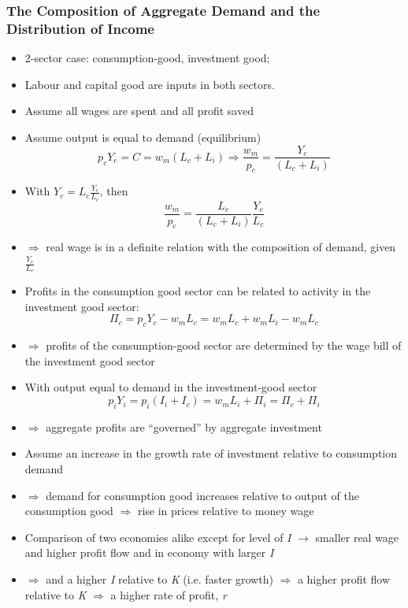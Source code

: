 \documentclass[a4paper,twoside]{article}
\numberwithin{equation}{section}
\numberwithin{figure}{section}
\begin{document}
\subsubsection{The Composition of Aggregate Demand and the Distribution of Income}
	\begin{itemize}
		\item 2-sector case: consumption-good, investment good;
		\item Labour and capital good are inputs in both sectors.
		\item Assume all wages are spent and all profit saved
		\item Assume output is equal to demand (equilibrium)
		\begin{equation}
			p_c Y_c = C = w_m \left( L_c + L_i \right) \Rightarrow \frac{w_m}{p_c} = \frac{Y_c}{\left( L_c + L_i \right)} \label{E:4.17}
		\end{equation}
		\item With \( Y_c = L_c \frac{Y_c}{L_c} \), then
		\begin{equation}
			\frac{w_m}{p_c} = \frac{L_c}{\left( L_c + L_i \right)}\frac{Y_c}{L_c} \label{E:4.18}
		\end{equation}
		\item \(\Rightarrow\) real wage is in a definite relation with the composition of demand, given \( \frac{Y_c}{L_c} \)
		\item  Profits in the consumption good sector can be related to activity in the investment good sector: 
		\begin{equation}
			\Pi_c = p_c Y_c - w_m L_c = w_m L_c + w_m L_i - w_m L_c \label{E:4.19}
		\end{equation}
		\item \( \Rightarrow \) profits of the consumption-good sector are determined by the wage bill of the investment good sector
		\item With output equal to demand in the investment-good sector
		\begin{equation}
			p_i Y_i = p_i \left( I_i + I_c \right) = w_m L_i + \Pi_i = \Pi_c + \Pi_i \label{E:4.20}
		\end{equation}
		\item \( \Rightarrow \) aggregate profits are ``governed'' by aggregate investment 
		\item Assume an increase in the growth rate of investment relative to consumption demand
		\item \( \Rightarrow \) demand for consumption good increases relative to output of the consumption good \( \Rightarrow \) rise in prices relative to money wage
		\item Comparison of two economies alike except for level of \textit{I} \( \rightarrow \) smaller real wage and higher profit flow and in economy with larger \textit{I}
		\item \textcolor{myred}{\( \Rightarrow \) and a higher \textit{I} relative to \textit{K} (i.e. faster growth) \( \Rightarrow \) a higher profit flow relative to \textit{K} \( \Rightarrow \) a higher rate of profit, \textit{r}}
	\end{itemize}
\end{document}
